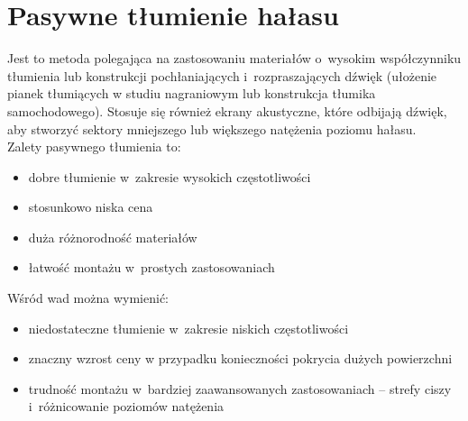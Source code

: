 \section{Pasywne tłumienie hałasu}
\label{sec:PNC}
Jest to metoda polegająca na zastosowaniu materiałów o~wysokim współczynniku tłumienia lub konstrukcji pochłaniających i~rozpraszających dźwięk (ułożenie pianek tłumiących w studiu nagraniowym lub konstrukcja tłumika samochodowego). Stosuje się również ekrany akustyczne, które odbijają dźwięk, aby stworzyć sektory mniejszego lub większego natężenia poziomu hałasu.\\
Zalety pasywnego tłumienia to:
\begin{itemize}
	\item dobre tłumienie w~zakresie wysokich częstotliwości
	\item stosunkowo niska cena
	\item duża różnorodność materiałów
	\item łatwość montażu w~prostych zastosowaniach
\end{itemize}
Wśród wad można wymienić:
\begin{itemize}
	\item niedostateczne tłumienie w~zakresie niskich częstotliwości
	\item znaczny wzrost ceny w przypadku konieczności pokrycia dużych powierzchni
	\item trudność montażu w~bardziej zaawansowanych zastosowaniach -- strefy ciszy i~różnicowanie poziomów natężenia
\end{itemize}

